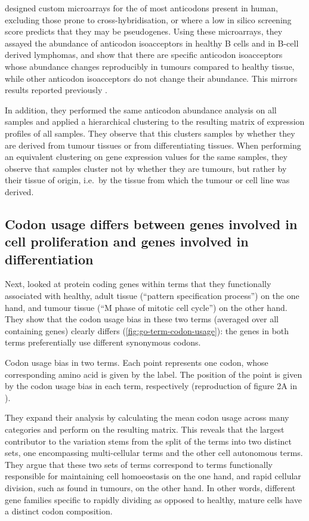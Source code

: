 \citet{Gingold:2014} designed custom microarrays for the \trna[s] of most
anticodons present in human, excluding those prone to cross-hybridi\-sation, or
where a low in silico screening score predicts that they may be pseudogenes.
Using these microarrays, they assayed the abundance of anticodon isoacceptors in
healthy B cells and in B-cell derived lymphomas, and show that there are
specific anticodon isoacceptors whose abundance changes reproducibly in tumours
compared to healthy tissue, while other anticodon isoacceptors do not change
their abundance. This mirrors results reported previously
\citep{Pavon-Eternod:2009}.

In addition, they performed the same \trna anticodon abundance analysis on all
samples and applied a hierarchical clustering to the resulting matrix of \trna
expression profiles of all samples. They observe that this clusters samples by
whether they are derived from tumour tissues or from differentiating tissues.
When performing an equivalent clustering on \mrna gene expression values for the
same samples, they observe that samples cluster not by whether they are tumours,
but rather by their tissue of origin, i.e.\ by the tissue from which the tumour
or cell line was derived.

\subsection{Codon usage differs between genes involved in cell proliferation and
genes involved in differentiation}

Next, \citet{Gingold:2014} looked at protein coding genes within \go terms that
they functionally associated with healthy, adult tissue (“pattern specification
process”) on the one hand, and tumour tissue (“M phase of mitotic cell cycle”)
on the other hand. They show that the codon usage bias in these two \go terms
(averaged over all containing genes) clearly differs
(\cref{fig:go-term-codon-usage}): the genes in both \go terms preferentially use
different synonymous codons.

    {Codon usage bias in two  terms.}
    {Each point represents one codon, whose corresponding amino acid is given by
    the label. The position of the point is given by the codon usage bias in
    each \go term, respectively (reproduction of figure 2A in
    \citet{Gingold:2014}).}

They expand their analysis by calculating the mean codon usage across many \go
categories and perform \pca on the resulting matrix. This reveals that the
largest contributor to the variation stems from the split of the \go terms into
two distinct sets, one encompassing multi-cellular \go terms and the other cell
autonomous \go terms. They argue that these two sets of \go terms correspond to
\go terms functionally responsible for maintaining cell homoeostasis on the one
hand, and rapid cellular division, such as found in tumours, on the other hand.
In other words, different gene families specific to rapidly dividing as opposed
to healthy, mature cells have a distinct codon composition.

